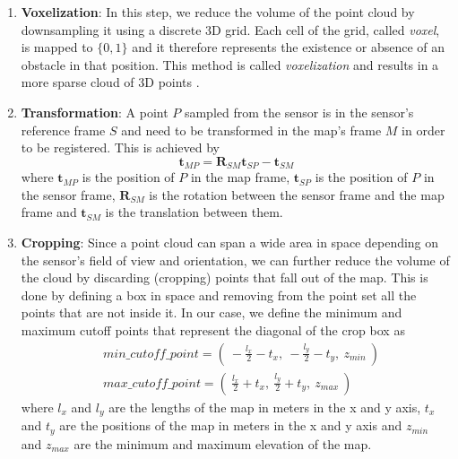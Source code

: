 \begin{enumerate}
    \item \textbf{Voxelization}:
        In this step, we reduce the volume of the point cloud by downsampling
        it using a discrete 3D grid.
        Each cell of the grid, called \textit{voxel}, is mapped to $\{0,1\}$
        and it therefore represents the existence or absence of an obstacle
        in that position.
        This method is called \textit{voxelization} and results in a more
        sparse cloud of 3D points \parencite{Hinks2013}.

    \item \textbf{Transformation}:
        A point $P$ sampled from the sensor is in the sensor's reference frame
        $S$ and need to be transformed in the map's frame $M$ in order to be
        registered.
        This is achieved by
        \begin{equation} \label{eq:point_cloud_tf}
            \mathbf{t}_{MP} =
                \mathbf{R}_{SM} \mathbf{t}_{SP} -
                \mathbf{t}_{SM}
        \end{equation}
        where
        $\mathbf{t}_{MP}$ is the position of $P$ in the map frame,
        $\mathbf{t}_{SP}$ is the position of $P$ in the sensor frame,
        $\mathbf{R}_{SM}$ is the rotation between the sensor frame and the
        map frame and
        $\mathbf{t}_{SM}$ is the translation between them.

    \item \textbf{Cropping}:
        Since a point cloud can span a wide area in space depending on the
        sensor's field of view and orientation, we can further reduce the
        volume of the cloud by discarding (cropping) points that fall out
        of the map.
        This is done by defining a box in space and removing
        from the point set all the points that are not inside it.
        In our case, we define the minimum and maximum cutoff points that
        represent the diagonal of the crop box as
        \begin{equation}
        \begin{aligned}
            &min\_cutoff\_point =
                \left( \
                    - \frac{l_x}{2} - t_x, \
                    - \frac{l_y}{2} - t_y, \
                    z_{min} \
                \right) \\
            &max\_cutoff\_point =
                \left( \
                    \frac{l_x}{2} + t_x, \
                    \frac{l_y}{2} + t_y, \
                    z_{max} \
                \right)
        \end{aligned}
        \end{equation}
        where
        $l_x$ and $l_y$ are the lengths of the map in meters in the
        x and y axis,
        $t_x$ and $t_y$ are the positions of the map in meters in the
        x and y axis and
        $z_{min}$ and $z_{max}$ are the minimum and maximum elevation
        of the map.


\end{enumerate}
